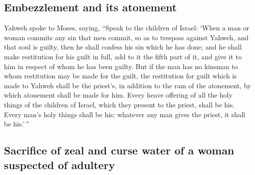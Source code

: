 \begin{paracol}{2}
\begin{otherlanguage}{english}
\hypertarget{embezzlement-and-its-atonement}{%
\subsection{Embezzlement and its
atonement}\label{embezzlement-and-its-atonement}}

 Yahweh spoke to Moses, saying,  ``Speak to
the children of Israel: `When a man or woman commits any sin that men
commit, so as to trespass against Yahweh, and that soul is guilty,
 then he shall confess his sin which he has done; and he
shall make restitution for his guilt in full, add to it the fifth part
of it, and give it to him in respect of whom he has been guilty.
 But if the man has no kinsman to whom restitution may be
made for the guilt, the restitution for guilt which is made to Yahweh
shall be the priest's, in addition to the ram of the atonement, by which
atonement shall be made for him.  Every heave offering of
all the holy things of the children of Israel, which they present to the
priest, shall be his.  Every man's holy things shall be
his; whatever any man gives the priest, it shall be his.'\,''

\hypertarget{sacrifice-of-zeal-and-curse-water-of-a-woman-suspected-of-adultery}{%
\subsection{Sacrifice of zeal and curse water of a woman suspected of
adultery}\label{sacrifice-of-zeal-and-curse-water-of-a-woman-suspected-of-adultery}}


\end{otherlanguage}
\end{paracol}
